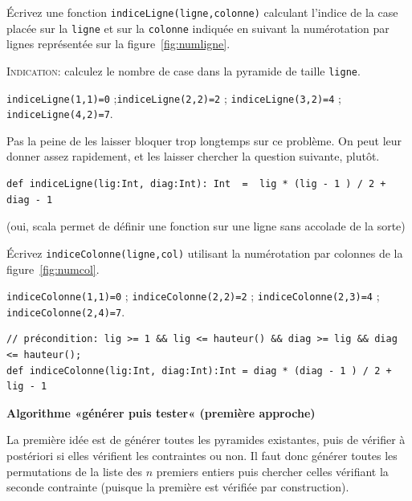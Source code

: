 \documentclass[10pt]{article}\usepackage[correction,nu]{esial}
\begin{document}
\begin{Question}
  Écrivez une fonction \texttt{indiceLigne(ligne,colonne)} calculant l'indice de la
  case placée sur la \texttt{ligne} et sur la \texttt{colonne} indiquée en
  suivant la numérotation par lignes représentée sur la
  figure~\ref{fig:numligne}.

  \noindent\textsc{Indication:} calculez le nombre de case dans la pyramide de
  taille \texttt{ligne}.

  \noindent\texttt{indiceLigne(1,1)=0} ;\hfill\texttt{indiceLigne(2,2)=2} ;
  \hfill\texttt{indiceLigne(3,2)=4} ; \hfill\texttt{indiceLigne(4,2)=7}. 
\end{Question}
\begin{Reponse}
  Pas la peine de les laisser bloquer trop longtemps sur ce problème. On peut
  leur donner assez rapidement, et les laisser chercher la question suivante,
  plutôt.

\begin{Verbatim}
def indiceLigne(lig:Int, diag:Int): Int  =  lig * (lig - 1 ) / 2 + diag - 1
\end{Verbatim}
(oui, scala permet de définir une fonction sur une ligne sans accolade de la sorte)
\end{Reponse}


\begin{Question}
  Écrivez \texttt{indiceColonne(ligne,col)} utilisant la numérotation par
  colonnes de la figure~\ref{fig:numcol}.

  \noindent\texttt{indiceColonne(1,1)=0} ; \hfill\texttt{indiceColonne(2,2)=2} ;
  \hfill\texttt{indiceColonne(2,3)=4} ; \hfill\texttt{indiceColonne(2,4)=7}.
\end{Question}
\begin{Reponse}
\begin{Verbatim}
// précondition: lig >= 1 && lig <= hauteur() && diag >= lig && diag <= hauteur();
def indiceColonne(lig:Int, diag:Int):Int = diag * (diag - 1 ) / 2 + lig - 1
\end{Verbatim}
\end{Reponse}

\begin{Exercice}\textbf{Algorithme «générer puis tester« (première approche)}

  \noindent La première idée est de générer toutes les pyramides existantes,
  puis de vérifier à postériori si elles vérifient les contraintes ou non. Il
  faut donc générer toutes les permutations de la liste des $n$ premiers
  entiers puis chercher celles vérifiant la seconde contrainte (puisque la
  première est vérifiée par construction).
\end{Exercice}
\end{document}
